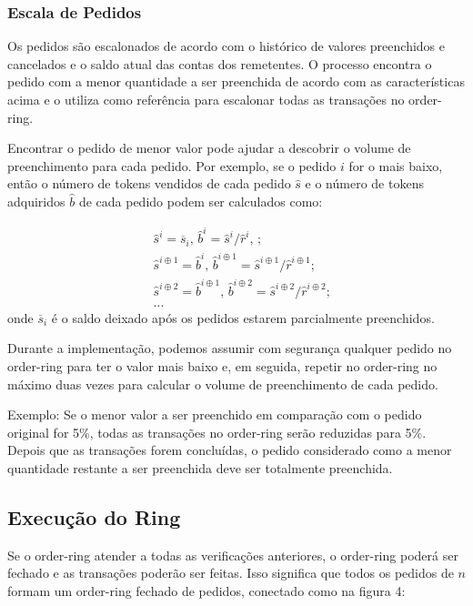 \documentclass[UTF8,nofonts]{article}
\begin{document}
\begin{multicols}{2}
\subsubsection{Escala de Pedidos\label{sec:order_scaling}}
Os pedidos são escalonados de acordo com o histórico de valores preenchidos e cancelados e o saldo atual das contas dos remetentes. O processo encontra o pedido com a menor quantidade a ser preenchida de acordo com as características acima e o utiliza como referência para escalonar todas as transações no order-ring.


Encontrar o pedido de menor valor pode ajudar a descobrir o volume de preenchimento para cada pedido. Por exemplo, se o pedido $i$ for o mais baixo, então o número de tokens vendidos de cada pedido $\hat{s}$ e o número de tokens adquiridos $\hat{b}$ de cada pedido podem ser calculados como:

\[
\begin{split}
&\hat{s}^{i}=\overline{s}_i\text{, } \hat{b}^{i}=\hat{s}^{i}/ \hat{r}^i\text{, }\text{;}\\
&\hat{s}^{i\oplus 1}=\hat{b}^i\text{, } \hat{b}^{i\oplus 1}=\hat{s}^{i\oplus 1}/ \hat{r}^{i\oplus 1}\text{;}\\
&\hat{s}^{i\oplus 2}=\hat{b}^{i\oplus 1}\text{, } \hat{b}^{i\oplus 2}=\hat{s}^{i\oplus 2}/ \hat{r}^{i\oplus 2}\text{;}\\
& ...
\end{split}
\]
onde $\overline{s}_i$ é o saldo deixado após os pedidos estarem parcialmente preenchidos.

Durante a implementação, podemos assumir com segurança qualquer pedido no order-ring para ter o valor mais baixo e, em seguida, repetir no order-ring no máximo duas vezes para calcular o volume de preenchimento de cada pedido. 

Exemplo: Se o menor valor a ser preenchido em comparação com o pedido original for 5\%, todas as transações no order-ring  serão reduzidas para 5\%. Depois que as transações forem concluídas, o pedido considerado como a menor quantidade restante a ser preenchida deve ser totalmente preenchida.

\subsection{Execução do Ring\label{sec:settlement}}

Se o order-ring atender a todas as verificações anteriores, o order-ring poderá ser fechado e as transações poderão ser feitas. Isso significa que todos os pedidos de $n$ formam um order-ring fechado de pedidos, conectado como na figura 4:


\end{multicols}
\end{document}
